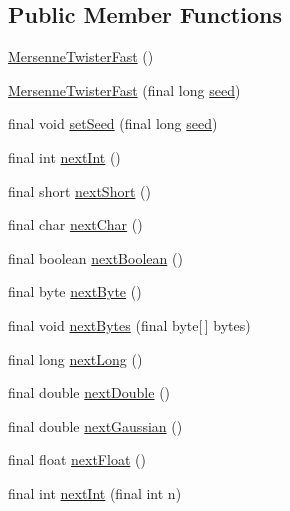 \subsection*{Public Member Functions}
\begin{DoxyCompactItemize}
\item 
\hyperlink{classjenes_1_1utils_1_1_mersenne_twister_fast_a7321af0f92bcda7c245ebfbb647f7e4c}{Mersenne\-Twister\-Fast} ()
\item 
\hyperlink{classjenes_1_1utils_1_1_mersenne_twister_fast_a554aee5d390bb57ad30577b194c8b7b2}{Mersenne\-Twister\-Fast} (final long \hyperlink{classjenes_1_1utils_1_1_mersenne_twister_fast_af54ad21e36a866d458e55ad8c3d89ac2}{seed})
\item 
final void \hyperlink{classjenes_1_1utils_1_1_mersenne_twister_fast_aa44ca1bf8e9a2f272e248ea279f1e80c}{set\-Seed} (final long \hyperlink{classjenes_1_1utils_1_1_mersenne_twister_fast_af54ad21e36a866d458e55ad8c3d89ac2}{seed})
\item 
final int \hyperlink{classjenes_1_1utils_1_1_mersenne_twister_fast_a063b45fa6e20a5eea9acbe45a8c48ce0}{next\-Int} ()
\item 
final short \hyperlink{classjenes_1_1utils_1_1_mersenne_twister_fast_a89d03c5b1815eff8c443ef081a869e78}{next\-Short} ()
\item 
final char \hyperlink{classjenes_1_1utils_1_1_mersenne_twister_fast_a8f7cb8ea9832581729660f5c0346ee3a}{next\-Char} ()
\item 
final boolean \hyperlink{classjenes_1_1utils_1_1_mersenne_twister_fast_a54fa48ab055886a90aefdcb816257f4b}{next\-Boolean} ()
\item 
final byte \hyperlink{classjenes_1_1utils_1_1_mersenne_twister_fast_a5e7c0943fcc746a30277f0e09abbf60f}{next\-Byte} ()
\item 
final void \hyperlink{classjenes_1_1utils_1_1_mersenne_twister_fast_a237dc55841fd8bf544106d052833c374}{next\-Bytes} (final byte\mbox{[}$\,$\mbox{]} bytes)
\item 
final long \hyperlink{classjenes_1_1utils_1_1_mersenne_twister_fast_a1de4f36e5e4035569bbb79bb06d4e9c7}{next\-Long} ()
\item 
final double \hyperlink{classjenes_1_1utils_1_1_mersenne_twister_fast_a64238ab497c1e504c798355f682ea2b9}{next\-Double} ()
\item 
final double \hyperlink{classjenes_1_1utils_1_1_mersenne_twister_fast_a4af0dd9a4366e476e4d45568cbb558e9}{next\-Gaussian} ()
\item 
final float \hyperlink{classjenes_1_1utils_1_1_mersenne_twister_fast_af2d30f1dec2a94ca26a3b1ccc0624ce9}{next\-Float} ()
\item 
final int \hyperlink{classjenes_1_1utils_1_1_mersenne_twister_fast_ae66ea69e37e4866fbb3beecb4e66577a}{next\-Int} (final int n)
\end{DoxyCompactItemize}
